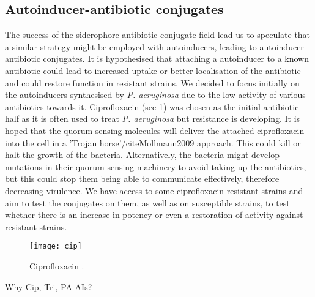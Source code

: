\subsection{Autoinducer-antibiotic conjugates}

The success of the siderophore-antibiotic conjugate field lead us to speculate that a similar strategy might be employed with autoinducers, leading to autoinducer-antibiotic conjugates. It is hypothesised that attaching a autoinducer to a known antibiotic could lead to increased uptake or better localisation of the antibiotic and could restore function in resistant strains. We decided to focus initially on the autoinducers synthesised by \textit{P. aeruginosa} due to the low activity of various antibiotics towards it. Ciprofloxacin  (see \ref{fgr:cip}) was chosen as the initial antibiotic half as it is often used to treat \textit{P. aeruginosa}\cite{Macgowan1999} but resistance is developing\cite{Su2010}. It is hoped that the quorum sensing molecules will deliver the attached ciprofloxacin into the cell in a 'Trojan horse'/cite{Mollmann2009} approach. This could kill or halt the growth of the bacteria. Alternatively, the bacteria might develop mutations in their quorum sensing machinery to avoid taking up the antibiotics, but this could stop them being able to communicate effectively, therefore decreasing virulence. 
We have access to some ciprofloxacin-resistant strains and aim to test the conjugates on them, as well as on susceptible strains, to test whether there is an increase in potency or even a restoration of activity against resistant strains. 


\begin{figure}[H]
	\begin{center}
		\texttt{[image: cip]}
		\caption{Ciprofloxacin . \label{fgr:cip}}
	\end{center}
\end{figure}

Why Cip, Tri, PA AIs?

